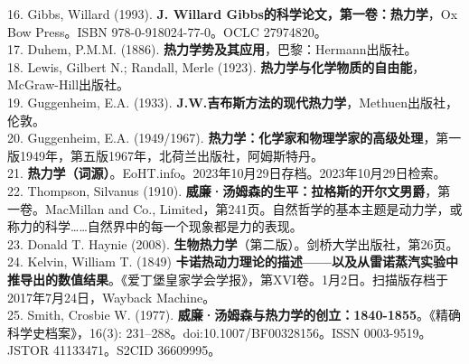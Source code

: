16. Gibbs, Willard (1993). \textbf{J. Willard Gibbs的科学论文，第一卷：热力学}，Ox Bow Press。ISBN 978-0-918024-77-0。OCLC 27974820。\\
17. Duhem, P.M.M. (1886). \textbf{热力学势及其应用}，巴黎：Hermann出版社。\\
18. Lewis, Gilbert N.; Randall, Merle (1923). \textbf{热力学与化学物质的自由能}，McGraw-Hill出版社。\\
19. Guggenheim, E.A. (1933). \textbf{J.W.吉布斯方法的现代热力学}，Methuen出版社，伦敦。\\
20. Guggenheim, E.A. (1949/1967). \textbf{热力学：化学家和物理学家的高级处理}，第一版1949年，第五版1967年，北荷兰出版社，阿姆斯特丹。\\
21. \textbf{热力学（词源）}。EoHT.info。2023年10月29日存档。2023年10月29日检索。\\
22. Thompson, Silvanus (1910). \textbf{威廉·汤姆森的生平：拉格斯的开尔文男爵}，第一卷。MacMillan and Co., Limited，第241页。自然哲学的基本主题是动力学，或称力的科学……自然界中的每一个现象都是力的表现。\\
23. Donald T. Haynie (2008). \textbf{生物热力学}（第二版）。剑桥大学出版社，第26页。\\
24. Kelvin, William T. (1849) \textbf{卡诺热动力理论的描述——以及从雷诺蒸汽实验中推导出的数值结果}。《爱丁堡皇家学会学报》，第XVI卷。1月2日。扫描版存档于2017年7月24日，Wayback Machine。\\
25. Smith, Crosbie W. (1977). \textbf{威廉·汤姆森与热力学的创立：1840-1855}。《精确科学史档案》，16(3): 231–288。doi:10.1007/BF00328156。ISSN 0003-9519。JSTOR 41133471。S2CID 36609995。\\
